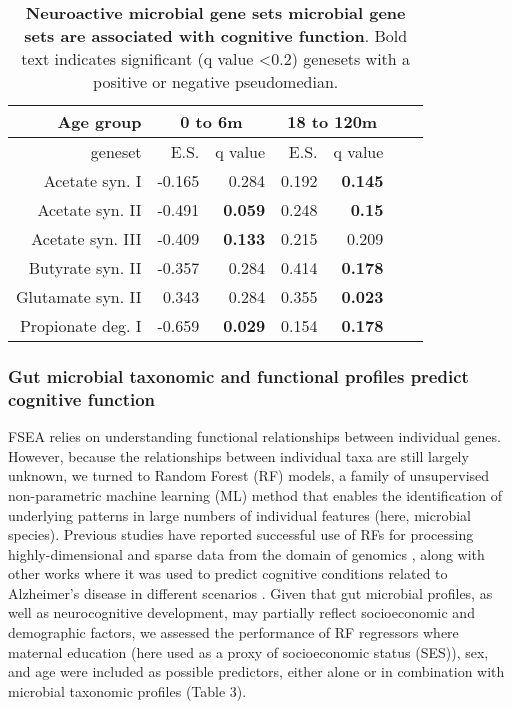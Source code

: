 \documentclass{article}
\providecommand{\DIFadd}[1]{{\protect\color{blue}\uwave{#1}}} %
\providecommand{\DIFaddbegin}{} %
\providecommand{\DIFaddend}{} %
\newcommand{\DIFaddincludegraphics}[2][]{{\color{blue}\fbox{\DIFOincludegraphics[#1]{#2}}}} %
\DeclareRobustCommand{\DIFaddbegin}{\DIFOaddbegin \let\includegraphics\DIFaddincludegraphics} %
\DeclareRobustCommand{\DIFaddend}{\DIFOaddend \let\includegraphics\DIFOincludegraphics} %
\begin{document}
\begin{table}[!h]
    \begin{center}
    \begin{tabular}{|r|r|r|r|r|r|r|}
        \hline
        \textbf{Age group}& \multicolumn{2}{c|}{\textbf{0 to 6m}} & \multicolumn{2}{c|}{\textbf{18 to 120m}} \\\hline
        geneset & E.S. & q value & E.S. & q value \\\hline
        Acetate syn. I & -0.165 & 0.284 & 0.192 & \textbf{0.145} \\
        Acetate syn. II & -0.491 & \textbf{0.059} & 0.248 & \textbf{0.15} \\
        Acetate syn. III & -0.409 & \textbf{0.133} & 0.215 & 0.209 \\
        Butyrate syn. II & -0.357 & 0.284 & 0.414 & \textbf{0.178} \\
        Glutamate syn. II & 0.343 & 0.284 & 0.355 & \textbf{0.023} \\
        Propionate deg. I & -0.659 & \textbf{0.029} & 0.154 & \textbf{0.178} \\\hline
    \end{tabular}
    \caption{\label{tab:fsea} \textbf{Neuroactive microbial gene sets microbial gene sets are associated with cognitive function}.
    Bold text indicates significant (q value \textless 0.2) genesets with a positive or negative
    pseudomedian.}
    \end{center}
\end{table}


\subsubsection*{Gut microbial taxonomic and functional profiles predict \DIFaddbegin \DIFadd{concurrently measured }\DIFaddend cognitive function}

FSEA relies on understanding functional relationships between individual
genes. However, because the relationships between individual taxa are
still largely unknown, we turned to Random Forest (RF) models, a family of 
unsupervised non-parametric machine learning (ML) method that enables
the identification of underlying patterns in large numbers of individual features
(here, microbial species).
Previous studies have reported
successful use of RFs for processing highly-dimensional and sparse data
from the domain of genomics
\cite{amaratungaEnrichedRandomForests2008,brieucPracticalIntroductionRandom2018,chenRandomForestsGenomic2012,franzosaGutMicrobiomeStructure2019,stephanRandomForestApproach2015},
along with other works where it was used
to predict cognitive conditions related to Alzheimer's disease in
different scenarios \cite{ardekaniPredictionIncipientAlzheimer2017,velazquezRandomForestModel2021}.
Given that gut microbial profiles, as well as neurocognitive
development, may partially reflect socioeconomic and demographic
factors, we assessed the performance of RF regressors where maternal
education (here used as a proxy of socioeconomic status (SES)),
sex, and age were included as possible predictors, either alone
or in combination with microbial taxonomic profiles (Table 3).
\end{document}
